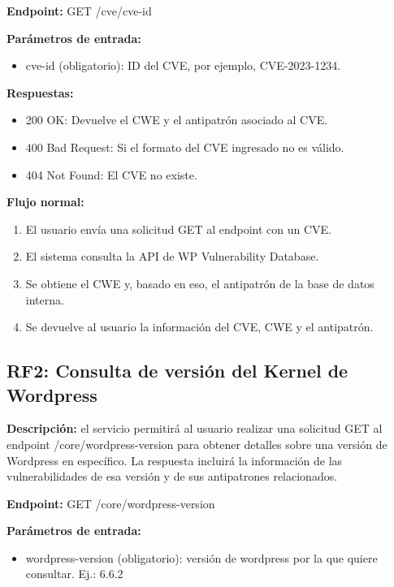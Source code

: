 \textbf{Endpoint:} GET /cve/{cve-id}

\textbf{Parámetros de entrada:} 
\begin{itemize}
    \item cve-id (obligatorio): ID del CVE, por ejemplo, CVE-2023-1234.
\end{itemize}

\textbf{Respuestas:}

\begin{itemize}
    \item 200 OK: Devuelve el CWE y el antipatrón asociado al CVE.
    \item 400 Bad Request: Si el formato del CVE ingresado no es válido.
    \item 404 Not Found: El CVE no existe.
\end{itemize}


\textbf{Flujo normal:}

\begin{enumerate}
    \item El usuario envía una solicitud GET al endpoint con un CVE.
    \item El sistema consulta la API de WP Vulnerability Database.
    \item Se obtiene el CWE y, basado en eso, el antipatrón de la base de datos interna.
    \item Se devuelve al usuario la información del CVE, CWE y el antipatrón.
\end{enumerate}

\subsection{RF2: Consulta de versión del Kernel de Wordpress}

\textbf{Descripción:} el servicio permitirá al usuario realizar una solicitud GET al endpoint /core/{wordpress-version} para obtener detalles sobre una versión de Wordpress en específico. La respuesta incluirá la información de las vulnerabilidades de esa versión y de sus antipatrones relacionados.

\textbf{Endpoint:} GET /core/{wordpress-version}

\textbf{Parámetros de entrada:}

\begin{itemize}
    \item wordpress-version (obligatorio): versión de wordpress por la que quiere consultar. Ej.: 6.6.2
\end{itemize}

